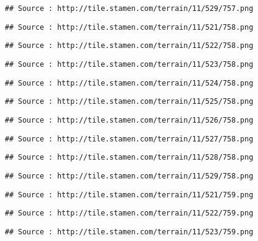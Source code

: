 \documentclass[
]{article}
\begin{document}
\begin{verbatim}
## Source : http://tile.stamen.com/terrain/11/529/757.png
\end{verbatim}

\begin{verbatim}
## Source : http://tile.stamen.com/terrain/11/521/758.png
\end{verbatim}

\begin{verbatim}
## Source : http://tile.stamen.com/terrain/11/522/758.png
\end{verbatim}

\begin{verbatim}
## Source : http://tile.stamen.com/terrain/11/523/758.png
\end{verbatim}

\begin{verbatim}
## Source : http://tile.stamen.com/terrain/11/524/758.png
\end{verbatim}

\begin{verbatim}
## Source : http://tile.stamen.com/terrain/11/525/758.png
\end{verbatim}

\begin{verbatim}
## Source : http://tile.stamen.com/terrain/11/526/758.png
\end{verbatim}

\begin{verbatim}
## Source : http://tile.stamen.com/terrain/11/527/758.png
\end{verbatim}

\begin{verbatim}
## Source : http://tile.stamen.com/terrain/11/528/758.png
\end{verbatim}

\begin{verbatim}
## Source : http://tile.stamen.com/terrain/11/529/758.png
\end{verbatim}

\begin{verbatim}
## Source : http://tile.stamen.com/terrain/11/521/759.png
\end{verbatim}

\begin{verbatim}
## Source : http://tile.stamen.com/terrain/11/522/759.png
\end{verbatim}

\begin{verbatim}
## Source : http://tile.stamen.com/terrain/11/523/759.png
\end{verbatim}
\end{document}
